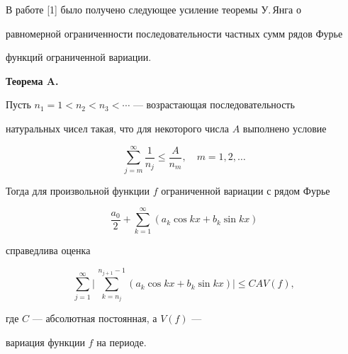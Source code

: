 

\maketitle


\label{begin}














В работе [1] было получено следующее усиление теоремы У.\,Янга о


равномерной ограниченности последовательности частных сумм рядов Фурье


функций ограниченной вариации.


\medskip





{\bf Теорема A.} {\it


Пусть $n_1 = 1 < n_2 < n_3 < \dotsb$ --- возрастающая последовательность


натуральных чисел такая, что для некоторого числа $A$ выполнено условие


\begin{equation}


\sum_{j = m}^{\infty} \frac{1}{n_j} \le \frac{A}{n_m},   \quad m = 1, 2,


\dotsc


\end{equation}


Тогда для произвольной функции $f$ ограниченной вариации с рядом Фурье


$$


\frac{a_0}{2} + \sum_{k = 1}^{\infty} (a_k \cos kx + b_k \sin kx)


$$


справедлива оценка


\begin{equation}


\sum_{j = 1}^{\infty} \bigg | \, \sum_{k = n_j}^{n_{j + 1} - 1}


( a_k \cos kx + b_k \sin kx ) \bigg | \le CA V(f),


\end{equation}


где $C$ --- абсолютная постоянная, а $V(f)$ ---


вариация функции $f$ на периоде.


}


